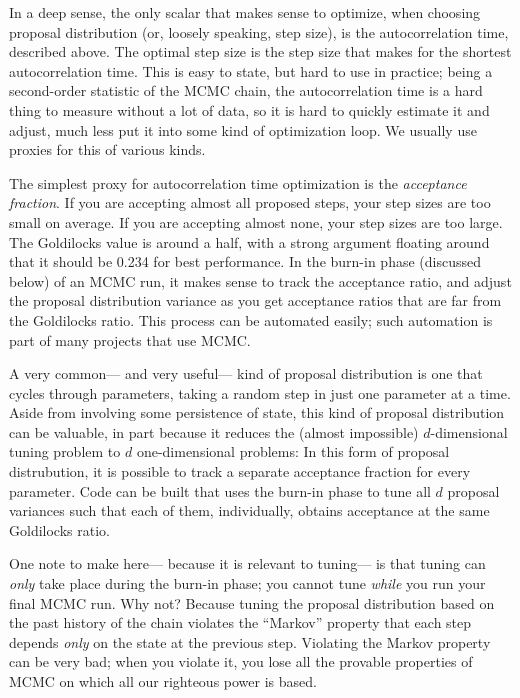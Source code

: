 \documentclass[12pt,twoside,pdftex]{article}
\begin{document}
In a deep sense, the only scalar that makes sense to optimize,
  when choosing proposal distribution (or, loosely speaking, step size),
  is the autocorrelation time, described above.
The optimal step size is the step size that makes for the shortest autocorrelation time.
This is easy to state, but hard to use in practice;
  being a second-order statistic of the MCMC chain,
  the autocorrelation time is a hard thing to measure without a lot of data,
  so it is hard to quickly estimate it and adjust,
  much less put it into some kind of optimization loop.
We usually use proxies for this of various kinds.

The simplest proxy for autocorrelation time optimization is the \emph{acceptance fraction}.
If you are accepting almost all proposed steps, your step sizes are too small on average.
If you are accepting almost none, your step sizes are too large.
The Goldilocks value is around a half,
  with a strong argument floating around that it should be 0.234 for best performance.
In the burn-in phase (discussed below) of an MCMC run,
  it makes sense to track the acceptance ratio,
  and adjust the proposal distribution variance as you get acceptance ratios
  that are far from the Goldilocks ratio.
This process can be automated easily;
  such automation is part of many projects that use MCMC.

A very common---%
  and very useful---%
  kind of proposal distribution is one that cycles through parameters,
  taking a random step in just one parameter at a time.
Aside from involving some persistence of state,
  this kind of proposal distribution can be valuable,
  in part because it reduces the (almost impossible) $d$-dimensional tuning problem
  to $d$ one-dimensional problems:
In this form of proposal distrubution,
  it is possible to track a separate acceptance fraction for every parameter.
Code can be built that uses the burn-in phase to tune all $d$ proposal variances
  such that each of them, individually,
  obtains acceptance at the same Goldilocks ratio.

One note to make here---%
  because it is relevant to tuning---%
  is that tuning can \emph{only} take place during the burn-in phase;
  you cannot tune \emph{while} you run your final MCMC run.
Why not?
Because tuning the proposal distribution based on the past history of the chain
  violates the ``Markov'' property
  that each step depends \emph{only} on the state at the previous step.
Violating the Markov property can be very bad;
  when you violate it,
  you lose all the provable properties of MCMC
  on which all our righteous power is based.
\end{document}
